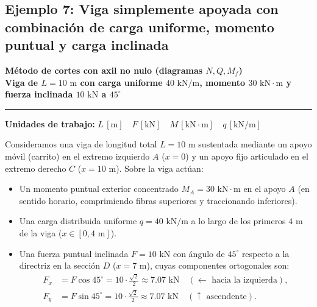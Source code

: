 \subsection{Ejemplo 7: Viga simplemente apoyada con combinación de carga uniforme, momento puntual y carga inclinada}

\begin{tcolorbox}[colback=blue!3!white, colframe=blue!40!black, arc=3pt, boxrule=0.8pt, left=8pt, right=8pt, top=6pt, bottom=6pt]
    \centering
    {\Large\bfseries\color{blue!60!black} Método de cortes con axil no nulo (diagramas $N, Q, M_f$)}\\[2pt]
    {\normalsize\bfseries Viga de $L = 10\text{ m}$ con carga uniforme $40\text{ kN/m}$, momento $30\text{ kN}\cdot\text{m}$ y fuerza inclinada $10\text{ kN}$ a $45^\circ$}

    \vspace{4pt}\hrule\vspace{4pt}
    {\small\textbf{Unidades de trabajo:} $L\,[\text{m}] \quad F\,[\text{kN}] \quad M\,[\text{kN}\cdot\text{m}] \quad q\,[\text{kN/m}]$}
\end{tcolorbox}


\noindent Consideramos una viga de longitud total $L = 10\text{ m}$ sustentada mediante un apoyo móvil (carrito) en el extremo izquierdo $A$ ($x = 0$) y un apoyo fijo articulado en el extremo derecho $C$ ($x = 10\text{ m}$). Sobre la viga actúan:
\begin{itemize}
    \item Un momento puntual exterior concentrado $M_A = 30\text{ kN}\cdot\text{m}$ en el apoyo $A$ (en sentido horario, comprimiendo fibras superiores y traccionando inferiores).
    \item Una carga distribuida uniforme $q = 40\text{ kN/m}$ a lo largo de los primeros $4\text{ m}$ de la viga ($x \in [0, 4\text{ m}]$).
    \item Una fuerza puntual inclinada $F = 10\text{ kN}$ con ángulo de $45^\circ$ respecto a la directriz en la sección $D$ ($x = 7\text{ m}$), cuyas componentes ortogonales son:
          \begin{align*}
              F_x & = F \cos 45^\circ = 10 \cdot \frac{\sqrt{2}}{2} \approx 7.07\text{ kN} \quad (\leftarrow\text{ hacia la izquierda}), \\
              F_y & = F \sin 45^\circ = 10 \cdot \frac{\sqrt{2}}{2} \approx 7.07\text{ kN} \quad (\uparrow\text{ ascendente}).
          \end{align*}
\end{itemize}

